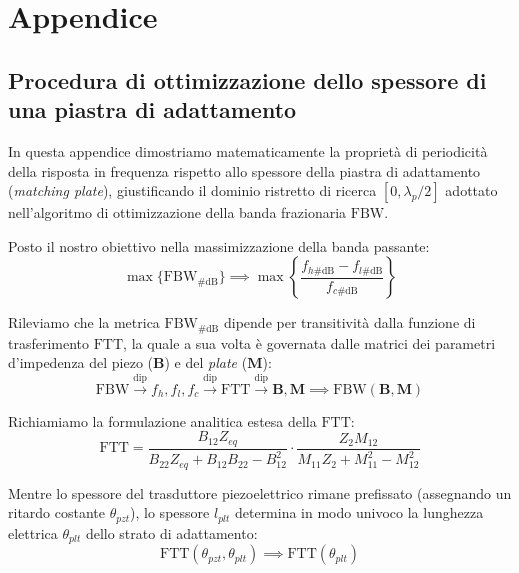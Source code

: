 \chapter*{Appendice}
\label{chap:appendice}

\section*{Procedura di ottimizzazione dello spessore di una piastra di adattamento}

In questa appendice dimostriamo matematicamente la proprietà di periodicità della risposta in frequenza rispetto allo spessore della piastra di adattamento (\textit{matching plate}), giustificando il dominio ristretto di ricerca $[0, \lambda_p/2]$ adottato nell'algoritmo di ottimizzazione della banda frazionaria $\text{FBW}$.

Posto il nostro obiettivo nella massimizzazione della banda passante:
\begin{equation}
    \max\{\text{FBW}_{\#\text{dB}}\} \implies \max \left\{ \frac{f_{h\#\text{dB}} - f_{l\#\text{dB}}}{f_{c\#\text{dB}}} \right\}
    \label{eq:a1_0}
\end{equation}

Rileviamo che la metrica $\text{FBW}_{\#\text{dB}}$ dipende per transitività dalla funzione di trasferimento $\text{FTT}$, la quale a sua volta è governata dalle matrici dei parametri d'impedenza del piezo ($\boldsymbol{B}$) e del \textit{plate} ($\boldsymbol{M}$):
\begin{equation}
    \text{FBW} \xrightarrow{\text{dip}} f_h, f_l, f_c \xrightarrow{\text{dip}} \text{FTT} \xrightarrow{\text{dip}} \boldsymbol{B}, \boldsymbol{M} \implies \text{FBW}(\boldsymbol{B}, \boldsymbol{M})
    \label{eq:a1_1}
\end{equation}

Richiamiamo la formulazione analitica estesa della $\text{FTT}$:
\begin{equation}
    \text{FTT} = \frac{B_{12} Z_{eq}}{B_{22} Z_{eq} + B_{12} B_{22} - B_{12}^2} \cdot \frac{Z_2 M_{12}}{M_{11} Z_2 + M_{11}^2 - M_{12}^2}
\end{equation}

Mentre lo spessore del trasduttore piezoelettrico rimane prefissato (assegnando un ritardo costante $\theta_{pzt}$), lo spessore $l_{plt}$ determina in modo univoco la lunghezza elettrica $\theta_{plt}$ dello strato di adattamento:
\begin{equation}
    \text{FTT}(\theta_{pzt}, \theta_{plt}) \implies \text{FTT}(\theta_{plt})
    \label{eq:a1_3}
\end{equation}

